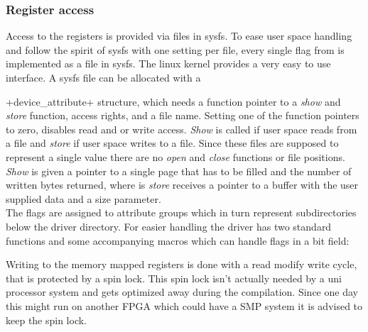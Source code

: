 \documentclass[12pt,a4paper,parskip=full,abstract=true,BCOR=12mm,twoside,open=right]{scrreprt}
\newcommand*{\SavedLstInline}{}
\DeclareRobustCommand*{\lstinline}{%
  \ifmmode
    \let\SavedBGroup\bgroup
    \def\bgroup{%
      \let\bgroup\SavedBGroup
      \hbox\bgroup
    }%
  \fi
  \SavedLstInline
}
\newcommand*{\lstitem}[1]{
  \setbox0\hbox{\lstinline{#1}}
  \item[\usebox0]
  \hfill \\
}
\begin{document}
\subsubsection{Register access}
Access to the registers is provided via files in sysfs\cite{sysfs}. To ease
user space handling and follow the spirit of sysfs with one setting per file,
every single flag from  is implemented as a file in
sysfs. The linux kernel provides a very easy to use interface. A sysfs file
can be allocated with a \lstinline+device_attribute+ structure, which needs
a function pointer to a \emph{show} and \emph{store} function, access rights,
and a file name. Setting one of the function pointers to zero, disables read
and or write access. \emph{Show} is called if user space reads from a file 
and \emph{store} if user space writes to a file. Since these files are
supposed to represent a single value there are no \emph{open} and \emph{close}
functions or file positions. \emph{Show} is given a pointer to a single page
that has to be filled and the number of written bytes returned, where is
\emph{store} receives a pointer to a buffer with the user supplied data and
a size parameter.\\
The flags are assigned to attribute groups which in turn represent
subdirectories below the driver directory. For easier handling the driver
has two standard functions and some accompanying macros which can handle
flags in a bit field:
Writing to the memory mapped registers is done with a read modify write cycle,
that is protected by a spin lock. This spin lock isn't actually needed by a
uni processor system and gets optimized away during the compilation. Since
one day this might run on another FPGA which could have a SMP system it is
advised to keep the spin lock.
\end{document}
